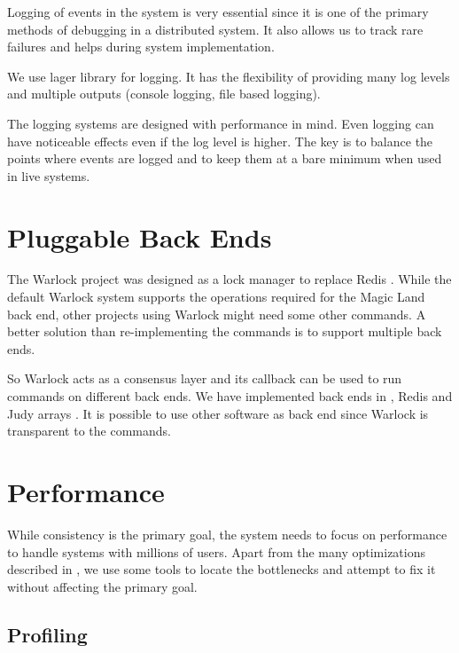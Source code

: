 Logging of events in the system is very essential since it is one of the primary
methods of debugging in a distributed system. It also allows us to track rare
failures and helps during system implementation.

We use lager \citep{lager} library for logging. It has the flexibility of
providing many log levels%
and multiple outputs (console logging, file based logging).

The logging systems are designed with performance in mind. Even logging can have
noticeable effects even if the log level is higher. The key is to balance the
points where events are logged and to keep them at a bare minimum when used in
live systems.

\section{Pluggable Back Ends}

The Warlock project was designed as a lock manager to replace Redis
\citep{redis}. While the default Warlock system supports the operations
required for the Magic Land back end, other projects using Warlock might need
some other commands. A better solution than re-implementing the commands is to
support multiple back ends.

So Warlock acts as a consensus layer and its callback can be used to run
commands on different back ends. We have implemented back ends in ,
Redis and Judy arrays \citep{judy}. It is possible to use other software
as back end since Warlock is transparent to the commands.

\section{Performance}

While consistency is the primary goal, the system needs to focus on performance
to handle systems with millions of users. Apart from the many optimizations
described in , we use some tools to locate 
the bottlenecks and attempt to fix it without affecting the primary goal.

\subsection{Profiling}
\label{section:impl.profiling}

